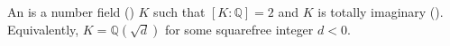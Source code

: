 \begin{definition} \label{definition:imaginary_quadratic_field}
An  is a number field () $K$ such that $[K : \mathbb{Q}] = 2$ and $K$ is totally imaginary (). Equivalently, $K = \mathbb{Q}(\sqrt{d})$ for some squarefree integer $d < 0$.
\end{definition}

